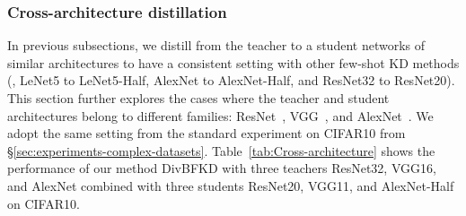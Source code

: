 \subsubsection{Cross-architecture distillation} \label{sec:experiments-crossarch}
\begin{foldable}
  In previous subsections, we distill from the teacher to a student networks of similar architectures to have a consistent setting with other few-shot KD methods (\eg, LeNet5 to LeNet5-Half, AlexNet to AlexNet-Half, and ResNet32 to ResNet20).
  This section further explores the cases where the teacher and student architectures belong to different families: ResNet~\cite{he2016deep}, VGG~\cite{simonyan2014very}, and AlexNet~\cite{krizhevsky2012imagenet}.
  We adopt the same setting from the standard experiment on CIFAR10 from \S\ref{sec:experiments-complex-datasets}.
  Table~\ref{tab:Cross-architecture} shows the performance of our method DivBFKD with three teachers ResNet32, VGG16, and AlexNet combined with three students ResNet20, VGG11, and AlexNet-Half on CIFAR10.
\end{foldable}

